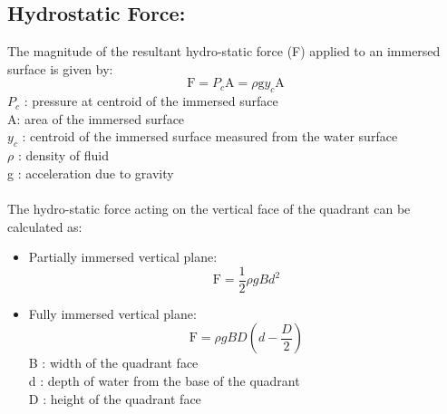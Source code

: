 \documentclass[12pt,a4paper]{article}
\begin{document}
\subsection{Hydrostatic Force:}
The magnitude of the resultant hydro-static force (F) applied to an immersed surface is given by:
\begin{equation}
	\text{F} = \text{$P_c$A} = \text{$\rho$g$y_c$A}
\end{equation}
$P_c$ : pressure at centroid of the immersed surface\\
A: area of the immersed surface\\
$y_c$ : centroid of the immersed surface measured from the water surface\\
$\rho$ : density of fluid\\
g : acceleration due to gravity\\
\\The hydro-static force acting on the vertical face of the quadrant can be calculated as:
\begin{itemize}
\item Partially immersed vertical plane:
\begin{equation}
	\text{F} = \frac{1}{2} \text{$\rho gBd^2$}
\end{equation}
\item Fully immersed vertical plane:
\begin{equation}
	\text{F} = \text{$\rho gBD(d - \frac{D}{2})$}
\end{equation}
B : width of the quadrant face\\
d : depth of water from the base of the quadrant\\
D : height of the quadrant face\\
\end{itemize}
\end{document}
